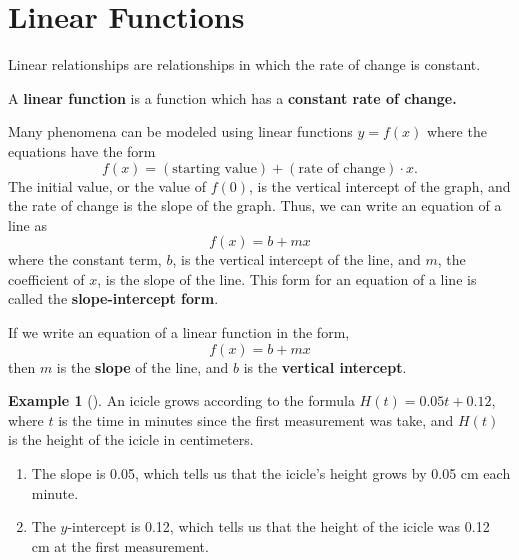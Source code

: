 \documentclass[10pt,]{book}
\newcommand{\terminology}[1]{\textbf{#1}}
\theoremstyle{plain}
\theoremstyle{definition}
\theoremstyle{definition}
\theoremstyle{definition}
\newtheorem{example}[theorem]{Example}
\theoremstyle{definition}
\numberwithin{equation}{section}
\let\oldsection\section
\renewcommand\section{\znewpage\oldsection}
\begin{document}
\section[{Linear Functions}]{Linear Functions}\label{subsection-7}
\hypertarget{p-67}{}%
Linear relationships are relationships in which the rate of change is constant. \begin{assemblage}\label{assemblage-3}
\hypertarget{p-68}{}%
A \terminology{linear function} is a function which has a \terminology{constant rate of change.}%
\end{assemblage}
 Many phenomena can be modeled using linear functions \(y = f (x)\) where the equations have the form%
\begin{equation*}
f (x) = (\text{starting value}) + (\text{rate of change}) \cdot x.
\end{equation*}
The initial value, or the value of \(f(0)\), is the vertical intercept of the graph, and the rate of change is the slope of the graph. Thus, we can write an equation of a line as%
\begin{equation*}
f (x) = b + mx
\end{equation*}
where the constant term, \(b\), is the vertical intercept of the line, and \(m\), the coefficient of \(x\), is the slope of the line. This form for an equation of a line is called the \terminology{slope-intercept form}.%
\begin{assemblage}\label{assemblage-4}
\hypertarget{p-69}{}%
If we write an equation of a linear function in the form,%
\begin{equation*}
f (x) = b + mx
\end{equation*}
then \(m\) is the \terminology{slope} of the line, and \(b\) is the \terminology{vertical intercept}.%
\end{assemblage}
\begin{example}[]\label{example-linear-function1}
\hypertarget{p-70}{}%
An icicle grows according to the formula \(H(t)=0.05t+0.12\), where \(t\) is the time in minutes since the first measurement was take, and \(H(t)\) is the height of the icicle in centimeters.%
\par
\hypertarget{p-71}{}%
\leavevmode%
\begin{enumerate}[label=\alph*]
\item\hypertarget{li-18}{}\hypertarget{p-72}{}%
The slope is 0.05, which tells us that the icicle's height grows by 0.05 cm each minute.%
\item\hypertarget{li-19}{}\hypertarget{p-73}{}%
The \(y\)-intercept is 0.12, which tells us that the height of the icicle was 0.12 cm at the first measurement.%
\end{enumerate}
%
\end{example}
\end{document}
